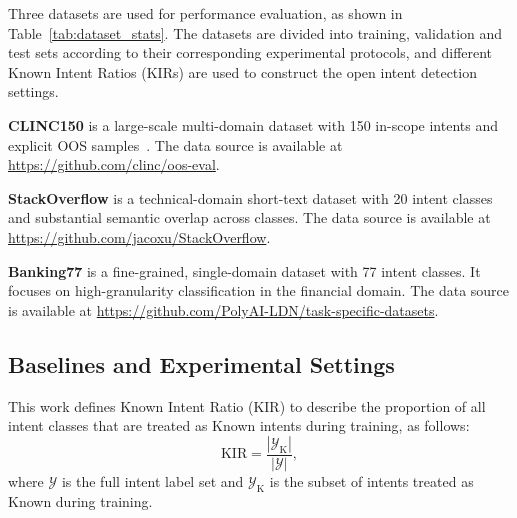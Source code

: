 \documentclass[11pt]{article}
\begin{document}
Three datasets are used for performance evaluation, as shown in Table~\ref{tab:dataset_stats}. The datasets are divided into training, validation and test sets according to their corresponding experimental protocols, and different Known Intent Ratios (KIRs) are used to construct the open intent detection settings.

\textbf{CLINC150} is a large-scale multi-domain dataset with 150 in-scope intents and explicit OOS samples~\citep{larson2019evaluation}. The data source is available at \url{https://github.com/clinc/oos-eval}.

\textbf{StackOverflow} is a technical-domain short-text dataset with 20 intent classes and substantial semantic overlap across classes. The data source is available at \url{https://github.com/jacoxu/StackOverflow}.

\textbf{Banking77} is a fine-grained, single-domain dataset with 77 intent classes. It focuses on high-granularity classification in the financial domain. The data source is available at \url{https://github.com/PolyAI-LDN/task-specific-datasets}.

\begin{table}[H]
\centering
\renewcommand{\arraystretch}{1.05}
\caption{Dataset statistics.}
\label{tab:dataset_stats}
\end{table}

\subsection{Baselines and Experimental Settings}

This work defines Known Intent Ratio (KIR) to describe the proportion of all intent classes that are treated as Known intents during training, as follows:
\begin{equation}
\mathrm{KIR}=\frac{|\mathcal{Y}_{\mathrm{K}}|}{|\mathcal{Y}|},
\end{equation}
where $\mathcal{Y}$ is the full intent label set and $\mathcal{Y}_{\mathrm{K}}$ is the subset of intents treated as Known during training.
\end{document}
